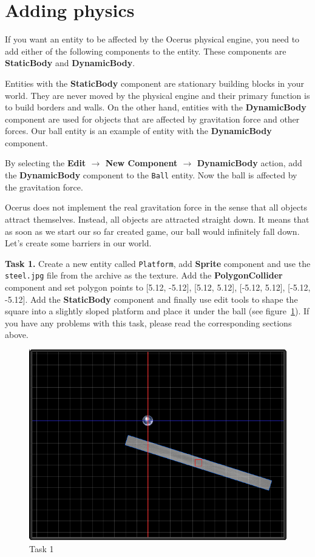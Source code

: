\documentclass[a4paper,12pt]{article}
\begin{document}
\section{Adding physics}
If you want an entity to be affected by the Ocerus physical engine, you need to add either of the following components to the entity. These components are \textbf{StaticBody} and \textbf{DynamicBody}.

Entities with the \textbf{StaticBody} component are stationary building blocks in your world. They are never moved by the physical engine and their primary function is to build borders and walls. On the other hand, entities with the \textbf{DynamicBody} component are used for objects that are affected by gravitation force and other forces. Our ball entity is an example of entity with the \textbf{DynamicBody} component.

By selecting the \textbf{Edit $\to$ New Component $\to$ DynamicBody} action, add the \textbf{DynamicBody} component to the \texttt{Ball} entity. Now the ball is affected by the gravitation force.

Ocerus does not implement the real gravitation force in the sense that all objects attract themselves. Instead, all objects are attracted straight down. It means that as soon as we start our so far created game, our ball would infinitely fall down. Let's create some barriers in our world.

\textbf{Task 1.} Create a new entity called \texttt{Platform}, add \textbf{Sprite} component and use the \texttt{steel.jpg} file from the archive as the texture. Add the \textbf{PolygonCollider} component and set polygon points to [5.12, -5.12], [5.12, 5.12], [-5.12, 5.12], [-5.12, -5.12]. Add the \textbf{StaticBody} component and finally use edit tools to shape the square into a slightly sloped platform and place it under the ball (see figure~\ref{fig:task_1}). If you have any problems with this task, please read the corresponding sections above.

\begin{figure}[ht]
 \begin{center}
  \includegraphics[scale=0.65]{Task1}
 \end{center}
 \caption{Task 1}
 \label{fig:task_1}
\end{figure}
\end{document}
